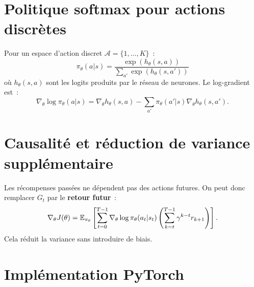 \section{Politique softmax pour actions discr\`etes}

\begin{definition}
Pour un espace d'action discret $\mathcal{A} = \{1, \ldots, K\}$~:
\[
    \pi_\theta(a | s) = \frac{\exp(h_\theta(s, a))}{\sum_{a'} \exp(h_\theta(s, a'))}
\]
o\`u $h_\theta(s, a)$ sont les logits produits par le r\'eseau de neurones.
Le log-gradient est~:
\[
    \nabla_\theta \log \pi_\theta(a|s) = \nabla_\theta h_\theta(s,a)
    - \sum_{a'} \pi_\theta(a'|s) \nabla_\theta h_\theta(s,a').
\]
\end{definition}

\section{Causalit\'e et r\'eduction de variance suppl\'ementaire}

\begin{proposition}
Les r\'ecompenses pass\'ees ne d\'ependent pas des actions futures. On peut
donc remplacer $G_t$ par le \textbf{retour futur}~:
\[
    \nabla_\theta J(\theta) = \mathbb{E}_{\pi_\theta}\left[
    \sum_{t=0}^{T-1} \nabla_\theta \log \pi_\theta(a_t|s_t)
    \left(\sum_{k=t}^{T-1} \gamma^{k-t} r_{k+1}\right)
    \right].
\]
Cela r\'eduit la variance sans introduire de biais.
\end{proposition}

\section{Impl\'ementation PyTorch}


